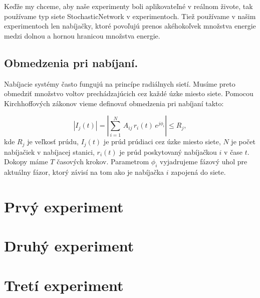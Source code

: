 Keďže my chceme, aby naše experimenty boli aplikovateľné v reálnom živote, tak používame typ siete StochasticNetwork v experimentoch. Tiež používame v našim experimentoch len nabíjačky, ktoré povoľujú prenos akéhokoľvek množstva energie medzi dolnou a hornou hranicou množstva energie.

\subsection{Obmedzenia pri nabíjaní.}
\label{Vych:konfig:obmedzenia}

Nabíjacie systémy často fungujú na princípe radiálnych sietí. Musíme preto obmedziť množstvo voltov prechádzajúcich cez každé úzke miesto siete. Pomocou Kirchhoffových zákonov vieme definovať obmedzenia pri nabíjaní takto: 

\begin{equation}\label{eq:current}
    |I_{j}(t)| = |\sum_{i=1}^{N} \, A_{ij} \, r_{i} (t) \,e^{j\phi_{i}}| \leq R_{j},
\end{equation}
kde $R_{j}$ je veľkosť prúdu, $I_{j}(t)$ je prúd prúdiaci cez úzke miesto siete, $N$ je počet nabíjačiek v nabíjacej stanici, $r_{i}(t)$ je prúd poskytovaný nabíjačkou $i$ v čase $t$. Dokopy máme $T$ časových krokov. Parametrom $\phi_{i}$ vyjadrujeme fázový uhol pre aktuálny fázor, ktorý závisí na tom ako je nabíjačka $i$ zapojená do siete. \cite{lee2021acnsim}  %

\UNFIN




\section{Prvý experiment}



\section{Druhý experiment}




\section{Tretí experiment}




